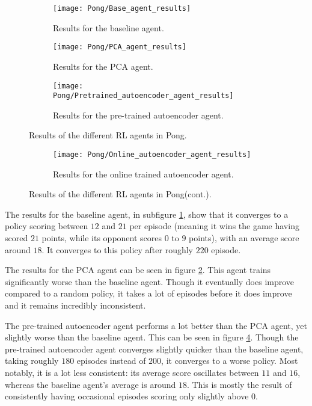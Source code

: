 \begin{figure}[h!]
	\centering
	\begin{subfigure}[b]{0.75\textwidth}
		\texttt{[image: Pong/Base\_agent\_results]}
		\caption{Results for the baseline agent.}
		\label{fig:results-base-pong} 
	\end{subfigure}
	\begin{subfigure}[b]{0.75\textwidth}
		\texttt{[image: Pong/PCA\_agent\_results]}
		\caption{Results for the PCA agent.}
		\label{fig:results-pca-pong}
	\end{subfigure}
	\begin{subfigure}[b]{0.75\textwidth}
		\texttt{[image: Pong/Pretrained\_autoencoder\_agent\_results]}
		\caption{Results for the pre-trained autoencoder agent.}
		\label{fig:results-ae-pong}
	\end{subfigure}
	\caption{Results of the different RL agents in Pong.}
\end{figure}%
\begin{figure}[ht]\ContinuedFloat
	\begin{subfigure}[b]{0.75\textwidth}
		\texttt{[image: Pong/Online\_autoencoder\_agent\_results]}
		\caption{Results for the online trained autoencoder agent.}
		\label{fig:results-online-ae-pong}
	\end{subfigure}
	\caption{Results of the different RL agents in Pong(cont.).}
	\label{fig:results-agents-pong}
\end{figure}

The results for the baseline agent, in subfigure \ref{fig:results-base-pong}, show that it converges to a policy scoring between $12$ and $21$ per episode (meaning it wins the game having scored $21$ points, while its opponent scores $0$ to $9$ points), with an average score around $18$. It converges to this policy after roughly $220$ episode.

The results for the PCA agent can be seen in figure \ref{fig:results-pca-pong}. This agent trains significantly worse than the baseline agent. Though it eventually does improve compared to a random policy, it takes a lot of episodes before it does improve and it remains incredibly inconsistent. %

The pre-trained autoencoder agent performs a lot better than the PCA agent, yet slightly worse than the baseline agent. This can be seen in figure \ref{fig:results-ae-pong}. Though the pre-trained autoencoder agent converges slightly quicker than the baseline agent, taking roughly $180$ episodes instead of $200$, it converges to a worse policy. Most notably, it is a lot less consistent: its average score oscillates between $11$ and $16$, whereas the baseline agent's average is around $18$. This is mostly the result of consistently having occasional episodes scoring only slightly above $0$.

